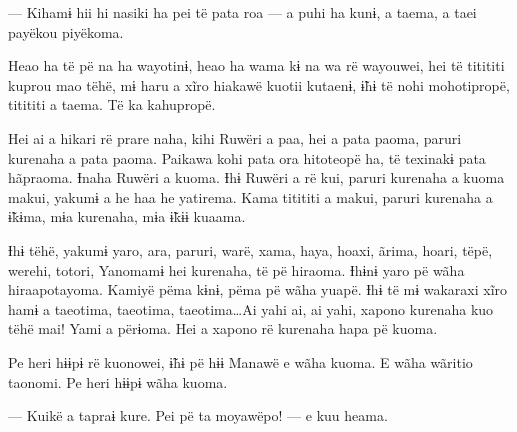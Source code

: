 --- Kihamɨ hii hi nasiki ha pei të pata roa --- a puhi ha kunɨ, a taema, a
taei payëkou piyëkoma. 


Heao ha të pë na ha wayotinɨ, heao ha wama kɨ na wa rë wayouwei, hei të
 titititi kuprou mao tëhë, mɨ haru a xĩro hiakawë kuotii kutaenɨ, ɨ̃hɨ të
 nohi mohotipropë, titititi a taema. Të ka kahupropë. 

Hei ai a hikari rë prare naha, kihi Ruwëri a paa, hei a pata paoma,
paruri kurenaha a pata paoma. Paikawa kohi pata ora hitoteopë ha, të
texinakɨ pata hãpraoma. Ɨnaha Ruwëri a kuoma. Ɨhɨ Ruwëri a rë kui,
paruri kurenaha a kuoma makui, yakumɨ a he haa he yatirema. Kama
titititi a makui, paruri kurenaha a ɨ̃kɨma, mɨa kurenaha, mɨa ɨ̃kɨɨ
kuaama. 

Ɨhɨ tëhë, yakumɨ yaro, ara, paruri, warë, xama, haya, hoaxi, ãrima,
hoari, tëpë, werehi, totori, Yanomamɨ hei kurenaha, të pë hiraoma. Ɨhɨnɨ
yaro pë wãha hiraapotayoma. Kamiyë pëma kɨnɨ, pëma pë wãha yuapë. Ɨhɨ të
mɨ wakaraxi xĩro hamɨ a taeotima, taeotima, taeotima…Ai yahi ai,
ai yahi, xapono kurenaha kuo tëhë mai! Yami a përɨoma. Hei a xapono rë
kurenaha hapa pë kuoma. 


Pe heri hɨɨpɨ rë kuonowei, ɨ̃hɨ pë hɨɨ Manawë e wãha kuoma. E wãha
wãritio taonomi. Pe heri hɨɨpɨ wãha kuoma. 

--- Kuikë a tapraɨ kure. Pei pë ta moyawëpo! --- e kuu heama. 


